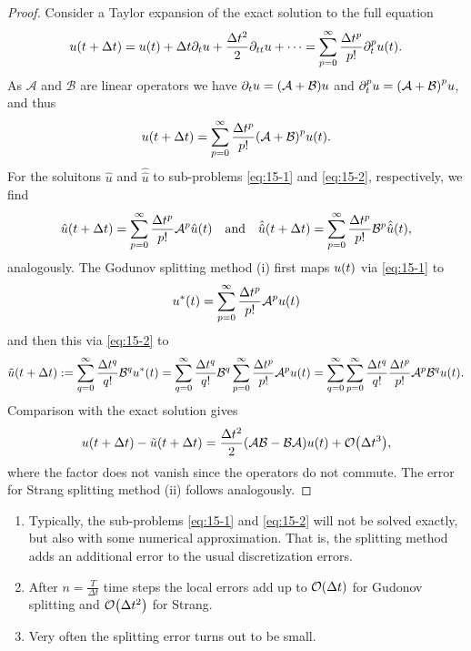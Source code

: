 \begin{proof}
	Consider a Taylor expansion of the exact solution to the full equation
	\[
		u\parentheses*{t + \Delta t} = u\parentheses*{t} + \Delta t\partial_t u + \frac{\Delta t^2}{2}\partial_{tt}u + \cdots = \sum_{p = 0}^\infty \frac{\Delta t^p}{p!}\partial_t^p u\parentheses*{t}.
	\]
	As \(\mathcal{A}\) and \(\mathcal{B}\) are linear operators we have \(\partial_t u = \parentheses*{\mathcal{A} + \mathcal{B}}u\) and \(\partial_t^p u = \parentheses*{\mathcal{A} + \mathcal{B}}^p u\), and thus
	\[
		u\parentheses*{t + \Delta t} = \sum_{p = 0}^\infty \frac{\Delta t^p}{p!}\parentheses*{\mathcal{A} + \mathcal{B}}^p u\parentheses*{t}.
	\]
	For the soluitons \(\hat{u}\) and \(\hat{\hat{u}}\) to sub-problems \eqref{eq:15-1} and \eqref{eq:15-2}, respectively, we find
	\[
		\hat{u}\parentheses*{t + \Delta t} = \sum_{p = 0}^\infty \frac{\Delta t^p}{p!}\mathcal{A}^p \hat{u}\parentheses*{t} \quad \text{and} \quad \hat{\hat{u}}\parentheses*{t + \Delta t} = \sum_{p = 0}^\infty \frac{\Delta t^p}{p!}\mathcal{B}^p \hat{\hat{u}}\parentheses*{t},
	\]
	analogously.
	The Godunov splitting method (i) first maps \(u\parentheses*{t}\) via \eqref{eq:15-1} to
	\[
		u^*\parentheses*{t} = \sum_{p = 0}^\infty \frac{\Delta t^p}{p!}\mathcal{A}^p u\parentheses*{t}
	\]
	and then this via \eqref{eq:15-2} to
	\[
		\tilde{u}\parentheses*{t + \Delta t} := \sum_{q = 0}^\infty \frac{\Delta t^q}{q!}\mathcal{B}^q u^*\parentheses*{t} = \sum_{q = 0}^\infty \frac{\Delta t^q}{q!}\mathcal{B}^q \sum_{p = 0}^\infty \frac{\Delta t^p}{p!}\mathcal{A}^p u\parentheses*{t} = \sum_{q = 0}^\infty \sum_{p = 0}^\infty \frac{\Delta t^q}{q!}\frac{\Delta t^p}{p!}\mathcal{A}^p \mathcal{B}^q u\parentheses*{t}.
	\]
	Comparison with the exact solution gives
	\[
		u\parentheses*{t + \Delta t} - \tilde{u}\parentheses*{t + \Delta t} = \frac{\Delta t^2}{2}\parentheses*{\mathcal{A}\mathcal{B} - \mathcal{B}\mathcal{A}}u\parentheses*{t} + \mathcal{O}\parentheses*{\Delta t^3},
	\]
	where the factor does not vanish since the operators do not commute.
	The error for Strang splitting method (ii) follows analogously.
\end{proof}

\begin{remark}
	\begin{enumerate}
		\item Typically, the sub-problems \eqref{eq:15-1} and \eqref{eq:15-2} will not be solved exactly, but also with some numerical approximation.
		That is, the splitting method adds an additional error to the usual discretization errors.
		\item After \(n = \frac{T}{\Delta t}\) time steps the local errors add up to \(\mathcal{O}\parentheses*{\Delta t}\) for Gudonov splitting and \(\mathcal{O}\parentheses*{\Delta t^2}\) for Strang.
		\item Very often the splitting error turns out to be small.
	\end{enumerate}
\end{remark}

